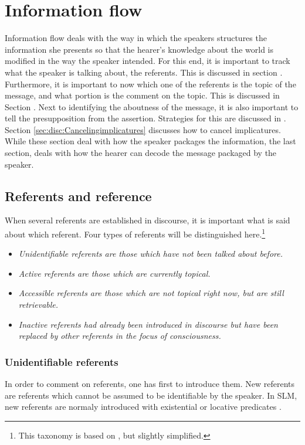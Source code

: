 \chapter{Information flow}\label{sec:Informationflow}
Information flow deals with the way in which the speakers structures the information she presents so that the hearer's knowledge about the world is modified in the way the speaker intended. For this end, it is important to track what the speaker is talking about, the referents. This is discussed in section . Furthermore, it is important to now which one of the referents is the topic of the message, and what portion is the comment on the topic. This is discussed in Section . Next to identifying the aboutness of the message, it is also important to tell the presupposition from the assertion. Strategies for this are discussed in .
Section \ref{sec:disc:Cancelingimplicatures} discusses how to cancel implicatures. While these section deal with how the speaker packages the information, the last section,  deals with how the hearer can decode the message packaged by the speaker.

\section{Referents and reference}\label{sec:disc:Referentsandreference}
When several referents are established in discourse, it is important what is said about which referent. Four types of referents will be distinguished here.\footnote{This taxonomy is based on \citet{Prince1981, Chafe1987, Lambrecht1994, VanValinEtAl1997}, but slightly simplified.}
\begin{itemize}
 \item \em Unidentifiable \em referents are those which have not been talked about before.
 \item \em Active \em referents are those which are currently topical.
 \item \em Accessible \em referents are those which are not topical right now, but are still retrievable.
 \item \em Inactive \em referents had already been introduced in discourse but have been replaced by other referents in the focus of consciousness.
\end{itemize}






\subsection{Unidentifiable referents}\label{sec:disc:Newreferents}
In order to comment on referents, one has first to introduce them. New referents are referents which cannot be assumed to be identifiable by the speaker. In SLM, new referents are normaly introduced with existential or locative predicates .

